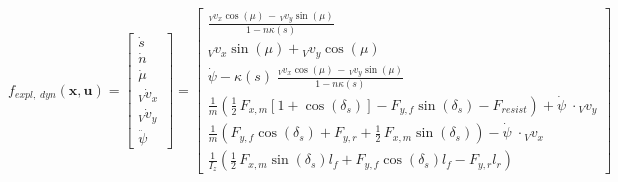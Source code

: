\documentclass[
a4paper, %
10pt, %
notitlepage,
english]{CSUniSchoolLabReport}
\begin{document}
\begin{equation}
	f_{expl,\;dyn}(\mathbf{x}, \mathbf{u}) =
	\left[\begin{array}{c}
		
		\dot{s} \\ 
		
		\dot{n} \\ 
		
		\dot{\mu} \\
		
		{}_V\dot{v}_x \\
		
		{}_V\dot{v}_y \\
		
		\ddot{\psi}\;\;\;
		
	\end{array}\right] =
	\left[\begin{array}{c}
		
		\frac{{}_V v_x \cos(\mu) \,-\, {}_V v_y \sin(\mu)}{1 - n \kappa(s)} \\
		
		{}_V v_x \sin(\mu) + {}_V v_y \cos(\mu) \\
 
		\dot{\psi} - \kappa(s)\;\frac{{}_V v_x \cos(\mu) \,-\, {}_V v_y \sin(\mu)}{1 - n \kappa(s)} \\
		
		\frac{1}{m}  \left( \frac{1}{2} \, F_{x, m} \left[1 + \cos(\delta_s)\right] - F_{y, f} \sin(\delta_s) - F_{resist} \right) + \dot{\psi}\;\cdot {}_V v_y \\
		
		\frac{1}{m}  \left( F_{y, f} \cos(\delta_s) + F_{y, r} + \frac{1}{2} \, F_{x, m} \sin(\delta_s) \right) - \dot{\psi}\;\cdot {}_V v_x \\
		
		\frac{1}{I_z}  \left( \frac{1}{2} \, F_{x, m} \sin(\delta_s) l_f + F_{y, f} \cos(\delta_s) l_f - F_{y, r} l_r \right)
	\end{array}\right]
\end{equation}
\end{document}
